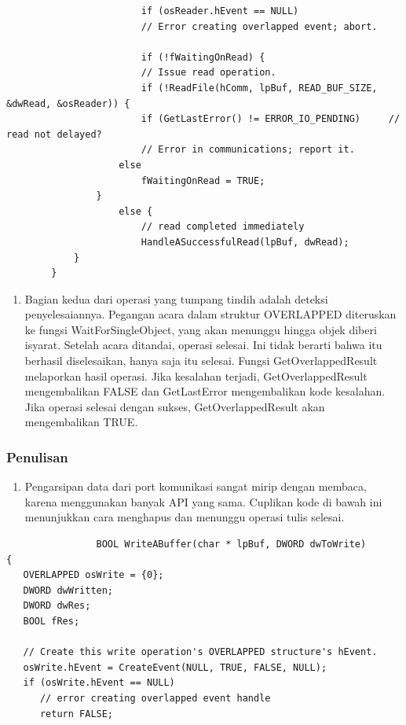\begin{enumerate}
\begin{enumerate}
\begin{verbatim}
						if (osReader.hEvent == NULL)
						// Error creating overlapped event; abort.

						if (!fWaitingOnRead) {
						// Issue read operation.
						if (!ReadFile(hComm, lpBuf, READ_BUF_SIZE, &dwRead, &osReader)) {
						if (GetLastError() != ERROR_IO_PENDING)     // read not delayed?
						// Error in communications; report it.
					else
						fWaitingOnRead = TRUE;
				}
					else {    
						// read completed immediately
						HandleASuccessfulRead(lpBuf, dwRead);
			}
		}
				\end{verbatim}

				\begin{enumerate}
						\item Bagian kedua dari operasi yang tumpang tindih adalah deteksi penyelesaiannya. Pegangan acara dalam struktur OVERLAPPED diteruskan ke fungsi WaitForSingleObject, yang akan menunggu hingga objek diberi isyarat. Setelah acara ditandai, operasi selesai. Ini tidak berarti bahwa itu berhasil diselesaikan, hanya saja itu selesai. Fungsi GetOverlappedResult melaporkan hasil operasi. Jika kesalahan terjadi, GetOverlappedResult mengembalikan FALSE dan GetLastError mengembalikan kode kesalahan. Jika operasi selesai dengan sukses, GetOverlappedResult akan mengembalikan TRUE.
				\end{enumerate}


			
		\end{enumerate}
			\subsubsection{Penulisan}
				\begin{enumerate}
					\item Pengarsipan data dari port komunikasi sangat mirip dengan membaca, karena menggunakan banyak API yang sama. Cuplikan kode di bawah ini menunjukkan cara menghapus dan menunggu operasi tulis selesai.
				\end{enumerate}
				\begin{verbatim}
				BOOL WriteABuffer(char * lpBuf, DWORD dwToWrite)
{
   OVERLAPPED osWrite = {0};
   DWORD dwWritten;
   DWORD dwRes;
   BOOL fRes;

   // Create this write operation's OVERLAPPED structure's hEvent.
   osWrite.hEvent = CreateEvent(NULL, TRUE, FALSE, NULL);
   if (osWrite.hEvent == NULL)
      // error creating overlapped event handle
      return FALSE;


\end{verbatim}
\end{enumerate}
